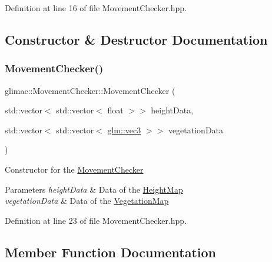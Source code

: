 Definition at line 16 of file Movement\+Checker.\+hpp.



\subsection{Constructor \& Destructor Documentation}
\mbox{\label{classglimac_1_1_movement_checker_aa1caa8e0675e3c877e2c4f398e150016}} 
\subsubsection{\texorpdfstring{Movement\+Checker()}{MovementChecker()}}
{\footnotesize\ttfamily glimac\+::\+Movement\+Checker\+::\+Movement\+Checker (\begin{DoxyParamCaption}\item[{std\+::vector$<$ std\+::vector$<$ float $>$$>$}]{height\+Data,  }\item[{std\+::vector$<$ std\+::vector$<$ \hyperlink{group__core__types_ga1c47e8b3386109bc992b6c48e91b0be7}{glm\+::vec3} $>$$>$}]{vegetation\+Data }\end{DoxyParamCaption})\hspace{0.3cm}{\ttfamily [inline]}}

Constructor for the \hyperlink{classglimac_1_1_movement_checker}{Movement\+Checker} 
\begin{DoxyParams}{Parameters}
{\em height\+Data} & Data of the \hyperlink{classglimac_1_1_height_map}{Height\+Map} \\
\hline
{\em vegetation\+Data} & Data of the \hyperlink{classglimac_1_1_vegetation_map}{Vegetation\+Map} \\
\hline
\end{DoxyParams}


Definition at line 23 of file Movement\+Checker.\+hpp.



\subsection{Member Function Documentation}
\mbox{\label{classglimac_1_1_movement_checker_a0ec58cde714926cf1f7b7e9d8c9ca1df}} 
